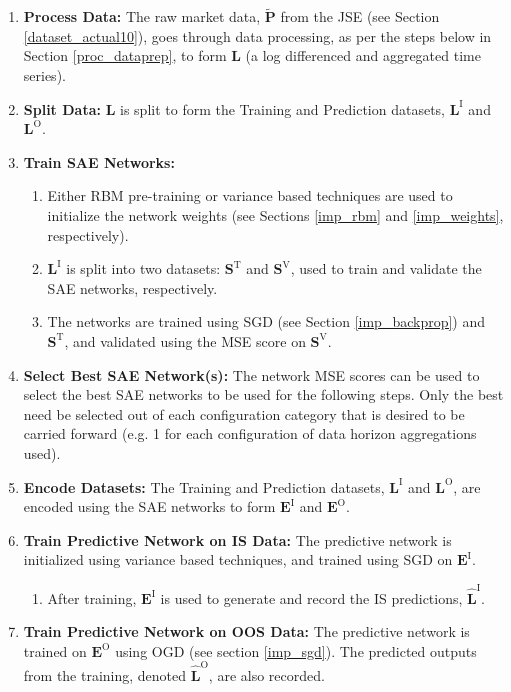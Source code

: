 \documentclass[a4paper,11pt,oneside]{article}
\theoremstyle{plain}
\theoremstyle{definition}
\begin{document}
	\begin{enumerate}
		\item \textbf{Process Data:} The raw market data, $\mathbf{\tilde{P}}$ from the JSE (see Section \ref{dataset_actual10}), goes through data processing, as per the steps below in Section \ref{proc_dataprep}, to form $\mathbf{L}$ (a log differenced and aggregated time series).
		\item \textbf{Split Data:}  $\mathbf{L}$ is split to form the Training and Prediction datasets, $\mathbf{L}^\mathrm{I}$ and $\mathbf{L}^\mathrm{O}$.
		\item \textbf{Train SAE Networks:} 
		\begin{enumerate}
			\item Either RBM pre-training or variance based techniques are used to initialize the network weights (see Sections \ref{imp_rbm} and \ref{imp_weights}, respectively).
			\item $\mathbf{L}^\mathrm{I}$ is split into two datasets: $\mathbf{S}^\mathrm{T}$ and $\mathbf{S}^\mathrm{V}$, used to train and validate the SAE networks, respectively.
			\item The networks are trained using SGD (see Section \ref{imp_backprop}) and $\mathbf{S}^\mathrm{T}$, and validated using the MSE score on $\mathbf{S}^\mathrm{V}$.
		\end{enumerate}
		\item \textbf{Select Best SAE Network(s):} The network MSE scores can be used to select the best SAE networks to be used for the following steps. Only the best need be selected out of each configuration category that is desired to be carried forward (e.g. 1 for each configuration of data horizon aggregations used).
		\item \textbf{Encode Datasets:} The Training and Prediction datasets, $\mathbf{L}^\mathrm{I}$ and $\mathbf{L}^\mathrm{O}$, are encoded using the SAE networks to form $\mathbf{E}^\mathrm{I}$ and $\mathbf{E}^\mathrm{O}$.
		\item \textbf{Train Predictive Network on IS Data:} The predictive network is initialized using variance based techniques, and trained using SGD on $\mathbf{E}^\mathrm{I}$.
		\begin{enumerate}
			\item After training, $\mathbf{E}^\mathrm{I}$ is used to generate and record the IS predictions, $\mathbf{\hat{L}}^\mathrm{I}$.
		\end{enumerate}
		\item \textbf{Train Predictive Network on OOS Data:} The predictive network is trained on $\mathbf{E}^\mathrm{O}$ using OGD (see section \ref{imp_sgd}). The predicted outputs from the training, denoted $\mathbf{\hat{L}}^\mathrm{O}$, are also recorded.

\end{enumerate}
\end{document}
